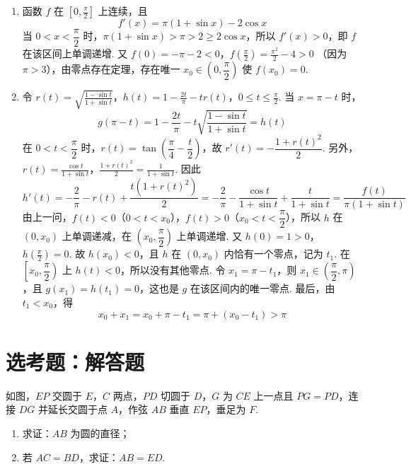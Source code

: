 \begin{solution}
\begin{enumerate}
\item 函数 \(f\) 在 \(\left[0,\frac{\pi}{2}\right]\) 上连续，且
\[
f'(x)=\pi(1+\sin x)-2\cos x
\]
当 \(0<x<\dfrac{\pi}{2}\) 时，\(\pi(1+\sin x)>\pi>2\geqslant2\cos x\)，所以 \(f'(x)>0\)，即 \(f\) 在该区间上单调递增. 又
\(f(0)=-\pi-2<0\)，\(f\left(\frac{\pi}{2}\right)=\frac{\pi^{2}}{2}-4>0\)
（因为 \(\pi>3\)），由零点存在定理，存在唯一 \(x_{0}\in\left(0,\dfrac{\pi}{2}\right)\) 使 \(f(x_{0})=0\).
\item 令
\(r(t)=\sqrt{\frac{1-\sin t}{1+\sin t}}\)，\(h(t)=1-\frac{2t}{\pi}-tr(t)\)，\(0\leqslant t\leqslant\frac{\pi}{2}\).
当 \(x=\pi-t\) 时，
\[
g(\pi-t)=1-\frac{2t}{\pi}-t\sqrt{\frac{1-\sin t}{1+\sin t}}=h(t)
\]
在 \(0<t<\dfrac{\pi}{2}\) 时，\(r(t)=\tan\left(\dfrac{\pi}{4}-\dfrac{t}{2}\right)\)，故 \(r'(t)=-\dfrac{1+r(t)^{2}}{2}\). 另外，
\(r(t)=\frac{\cos t}{1+\sin t}\)，\(\frac{1+r(t)^{2}}{2}=\frac{1}{1+\sin t}\).
因此
\[
h'(t)=-\frac{2}{\pi}-r(t)+\frac{t(1+r(t)^{2})}{2}=-\frac{2}{\pi}-\frac{\cos t}{1+\sin t}+\frac{t}{1+\sin t}=\frac{f(t)}{\pi(1+\sin t)}
\]
由上一问，\(f(t)<0\)（\(0<t<x_{0}\)），\(f(t)>0\)（\(x_{0}<t<\dfrac{\pi}{2}\)），所以 \(h\) 在 \((0,x_{0})\) 上单调递减，在 \(\left(x_{0},\dfrac{\pi}{2}\right)\) 上单调递增. 又
\(h(0)=1>0\)，\(h\left(\frac{\pi}{2}\right)=0\).
故 \(h(x_{0})<0\)，且 \(h\) 在 \((0,x_{0})\) 内恰有一个零点，记为 \(t_{1}\). 在 \(\left[x_{0},\dfrac{\pi}{2}\right)\) 上 \(h(t)<0\)，所以没有其他零点. 令 \(x_{1}=\pi-t_{1}\)，则 \(x_{1}\in\left(\dfrac{\pi}{2},\pi\right)\)，且 \(g(x_{1})=h(t_{1})=0\)，这也是 \(g\) 在该区间内的唯一零点. 最后，由 \(t_{1}<x_{0}\)，得
\[
x_{0}+x_{1}=x_{0}+\pi-t_{1}=\pi+(x_{0}-t_{1})>\pi
\]
\end{enumerate}
\end{solution}

\section{选考题：解答题}

\begin{problem}
如图，\(EP\) 交圆于 \(E\)，\(C\) 两点，\(PD\) 切圆于 \(D\)，\(G\) 为 \(CE\) 上一点且 \(PG = PD\)，连接 \(DG\) 并延长交圆于点 \(A\)，作弦 \(AB\) 垂直 \(EP\)，垂足为 \(F\).
\begin{enumerate}
\item 求证：\(AB\) 为圆的直径；
\item 若 \(AC = BD\)，求证：\(AB = ED\).
\end{enumerate}

\end{problem}

